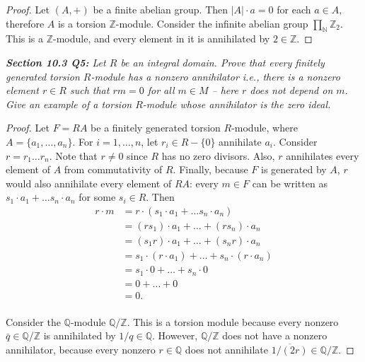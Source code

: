 \documentclass{article}
\begin{document}
  \begin{proof}
    Let $(A,+)$ be a finite abelian group. Then $|A|\cdot a=0$ for each
    $a\in A$, therefore $A$ is a torsion $\mathbb{Z}$-module. Consider the
    infinite abelian group $\prod_{\mathbb{N}}\mathbb{Z}_2$. This is a
    $\mathbb{Z}$-module, and every element in it is annihilated by
    $2\in\mathbb{Z}$.
  \end{proof}

\it \textbf{Section 10.3 Q5:} Let $R$ be an integral domain. Prove that
  every finitely generated torsion $R$-module has a nonzero annihilator
  i.e., there is a nonzero element $r\in R$ such that $rm=0$ for all $m\in
  M$ -- here $r$ does not depend on $m$. Give an example of a torsion
  $R$-module whose annihilator is the zero ideal.

  \begin{proof}
    Let $F=RA$ be a finitely generated torsion $R$-module, where
    $A=\{a_1,\ldots,a_n\}$. For $i=1,\ldots,n$, let $r_i\in R-\{0\}$
    annihilate $a_i$. Consider $r=r_1\ldots r_n$. Note that $r\neq0$ since
    $R$ has no zero divisors. Also, $r$ annihilates every element of $A$
    from commutativity of $R$. Finally, because $F$ is generated by $A$,
    $r$ would also annihilate every element of $RA$: every $m\in F$ can be
    written as $s_1\cdot a_1+\ldots s_n\cdot a_n$ for some $s_i\in R$. Then
    \begin{align*}
      r\cdot m &=r\cdot(s_1\cdot a_1+\ldots s_n\cdot a_n)\\
      &=(rs_1)\cdot a_1 +\ldots +(rs_n)\cdot a_n\\
      &=(s_1r)\cdot a_1 +\ldots +(s_nr)\cdot a_n\\
      &=s_1\cdot(r\cdot a_1) +\ldots +s_n\cdot(r\cdot a_n)\\
      &=s_1\cdot0 +\ldots +s_n\cdot0\\
      &=0 +\ldots +0\\
      &=0.\\
    \end{align*}

    Consider the $\mathbb{Q}$-module $\mathbb{Q}/\mathbb{Z}$. This is a
    torsion module because every nonzero $\bar{q}\in\mathbb{Q}/\mathbb{Z}$
    is annihilated by $1/q\in\mathbb{Q}$. However, $\mathbb{Q}/\mathbb{Z}$
    does not have a nonzero annihilator, because every nonzero
    $r\in\mathbb{Q}$ does not annihilate
    $\overline{1/(2r)}\in\mathbb{Q}/\mathbb{Z}$.
  \end{proof}
\end{document}
